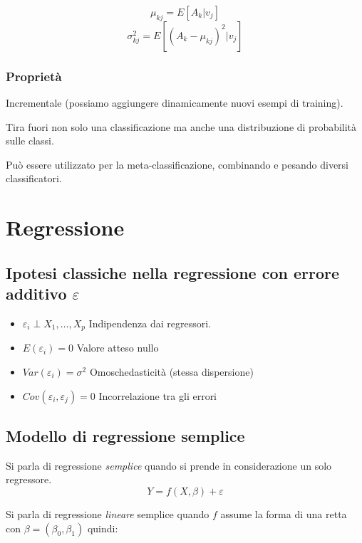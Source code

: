 \documentclass[11pt,onecolumn,a4paper,oneside]{book}
\begin{document}
$$\mu_{kj} = E \left[ A_k | v_j \right]$$
$$\sigma^2_{kj} = E \left[ (A_k - \mu_{kj})^2 | v_j \right]$$

\subsection{Proprietà}
Incrementale (possiamo aggiungere dinamicamente nuovi esempi di training).

Tira fuori non solo una classificazione ma anche una distribuzione di probabilità sulle classi.

Può essere utilizzato per la meta-classificazione, combinando e pesando diversi classificatori.


\chapter{Regressione}

\section{Ipotesi classiche nella regressione con errore additivo $\varepsilon$}
\label{ipotesi}

\begin{itemize}

\item $\varepsilon_i \perp X_1, \dots, X_p$ \hspace{.5cm} Indipendenza dai regressori.

\item $E(\varepsilon_i) = 0$ \hspace{1.5cm} Valore atteso nullo

\item $Var(\varepsilon_i) = \sigma^2$ \hspace{.9cm} Omoschedasticità (stessa dispersione)

\item $Cov(\varepsilon_i, \varepsilon_j ) = 0$  \hspace{.7cm} Incorrelazione tra gli errori
\end{itemize}

\section{Modello di regressione semplice}
Si parla di regressione \emph{semplice} quando si prende in considerazione un solo regressore.
$$Y= f \left( X, \beta \right) + \varepsilon$$

Si parla di regressione \emph{lineare} semplice quando $f$ assume la forma di una retta con $\beta = ( \beta_0, \beta_1 ) $ quindi:
\end{document}
